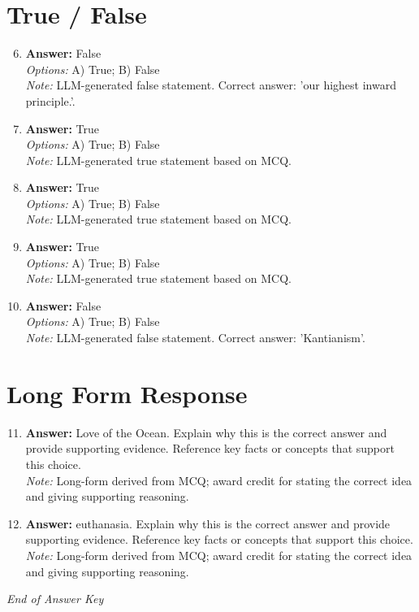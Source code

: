 \documentclass[12pt]{article}
\begin{document}
\section*{True / False}
\begin{enumerate}[label=\arabic*.]
\setcounter{enumi}{5}
\item \textbf{Answer:} False
\\ \textit{Options:} A) True; B) False
\\ \textit{Note:} LLM-generated false statement. Correct answer: 'our highest inward principle.'.
\item \textbf{Answer:} True
\\ \textit{Options:} A) True; B) False
\\ \textit{Note:} LLM-generated true statement based on MCQ.
\item \textbf{Answer:} True
\\ \textit{Options:} A) True; B) False
\\ \textit{Note:} LLM-generated true statement based on MCQ.
\item \textbf{Answer:} True
\\ \textit{Options:} A) True; B) False
\\ \textit{Note:} LLM-generated true statement based on MCQ.
\item \textbf{Answer:} False
\\ \textit{Options:} A) True; B) False
\\ \textit{Note:} LLM-generated false statement. Correct answer: 'Kantianism'.
\end{enumerate}

\section*{Long Form Response}
\begin{enumerate}[label=\arabic*.]
\setcounter{enumi}{10}
\item \textbf{Answer:} Love of the Ocean. Explain why this is the correct answer and provide supporting evidence. Reference key facts or concepts that support this choice.
\\ \textit{Note:} Long-form derived from MCQ; award credit for stating the correct idea and giving supporting reasoning.
\item \textbf{Answer:} euthanasia. Explain why this is the correct answer and provide supporting evidence. Reference key facts or concepts that support this choice.
\\ \textit{Note:} Long-form derived from MCQ; award credit for stating the correct idea and giving supporting reasoning.
\end{enumerate}

\vfill
\noindent\textit{End of Answer Key}
\end{document}
